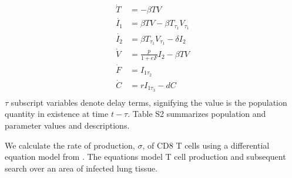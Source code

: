 \documentclass[preprint,10pt,numbers]{elsarticle}
\begin{document}
{\footnotesize
\begin{equation*}
\begin{aligned}
\dot{T} &= - \beta T V \\
\dot{I_1} &= \beta T V - \beta T_{\tau_1}V_{\tau_1} \\
\dot{I_2} &= \beta T_{\tau_1}V_{\tau_1} - \delta I_2 \\
\dot{V} &= \frac{p}{1+eF} I_2  - \beta T V  \\
\dot{F} &=  I_{1 \tau_2} \\
\dot{C} &= r I_{1 \tau_3} - d C \\
\end{aligned}
\tag{Eq. 1}
\label{eq:dde}
\end{equation*}
\vspace{.05in}
}
$\tau$ subscript variables denote delay terms, signifying the value is the population quantity in existence at time $t - \tau$.  Table S2 summarizes population and parameter values and descriptions.  






We calculate the rate of production, $\sigma$, of CD8 T cells using a differential equation model from \citep{Miao2010a}.  The equations model T cell production and subsequent search over an area of infected lung tissue.
\end{document}
